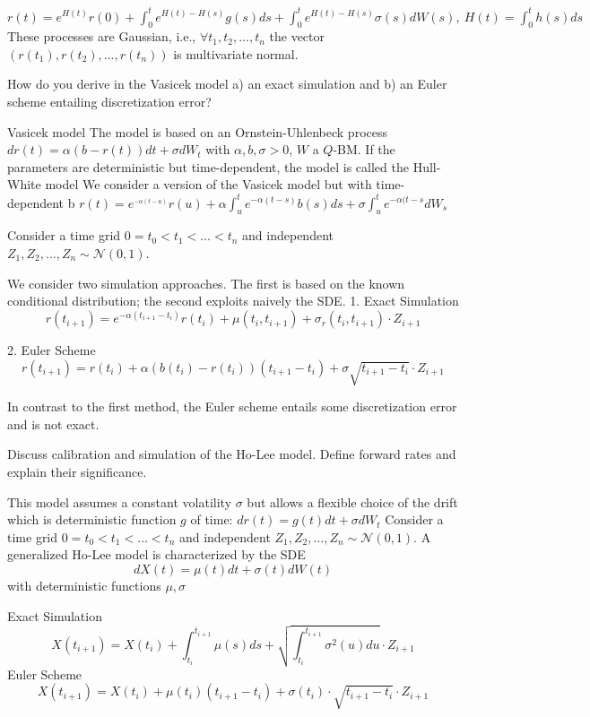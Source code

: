 \( r(t) = e^{H(t)} r(0) + \int_0^t e^{H(t)-H(s)} g(s) ds + \int_0^t e^{H(t)-H(s)} \sigma(s) dW(s), \ H(t) = \int_0^t h(s) ds \)
These processes are Gaussian, i.e., \(\forall t_1, t_2, ..., t_n\) the vector \((r(t_1), r(t_2), ..., r(t_n))\) is multivariate normal.

How do you derive in the Vasicek model a) an exact simulation and b) an Euler
scheme entailing discretization error?

Vasicek model
The model is based on an Ornstein-Uhlenbeck process
\( dr(t) = \alpha(b - r(t))dt + \sigma dW_t \)
with \( \alpha, b, \sigma > 0 \), \( W \) a \( Q \)-BM.
If the parameters are deterministic but time-dependent, the model is called the Hull-White model
We consider a version of the Vasicek model but with time-dependent b
\( r(t) = e^_{-\alpha(t-u)}r(u) + \alpha \int_{u}^{t} e^{-\alpha(t - s)} b(s) ds + \sigma \int_{u}^{t} e^{-\alpha(t-s}dW_s \)

Consider a time grid \(0=t_{0}<t_{1}<\dots<t_{n}\) and independent \(Z_{1},Z_{2},\dots,Z_{n}\sim\mathcal{N}(0,1)\).

We consider two simulation approaches. The first is based on the known conditional distribution; the second exploits naively the SDE.
1. Exact Simulation
\[r(t_{i+1})=e^{-\alpha(t_{i+1}-t_{i})}r(t_{i})+\mu(t_{i},t_{i+1})+\sigma_{r}(t_{i},t_{i+1})\cdot Z_{i+1}\]

2. Euler Scheme
\[r(t_{i+1})=r(t_{i})+\alpha(b(t_{i})-r(t_{i}))(t_{i+1}-t_{i})+\sigma\sqrt{t_{i+1}-t_{i}}\cdot Z_{i+1}\]

In contrast to the first method, the Euler scheme entails some discretization error and is not exact. 

Discuss calibration and simulation of the Ho-Lee model. Define forward rates and
explain their significance.

This model assumes a constant volatility \( \sigma \) but allows a flexible choice of the drift which is deterministic
function \( g \) of time:
\( dr(t) = g(t)dt + \sigma dW_t \)
Consider a time grid \(0=t_{0}<t_{1}<\dots<t_{n}\) and independent \(Z_{1},Z_{2},\dots,Z_{n}\sim\mathcal{N}(0,1)\).
 A generalized Ho-Lee model is characterized by the SDE
\[dX(t)=\mu(t)dt+\sigma(t)dW(t)\]
with deterministic functions \(\mu,\sigma\)

Exact Simulation
\[X(t_{i+1})=X(t_{i})+\int_{t_{i}}^{t_{i+1}}\mu(s)ds+\sqrt{\int_{t_{i}}^{t_{i+1}}\sigma^{2}(u)du}\cdot Z_{i+1}\]
Euler Scheme
\[X(t_{i+1})=X(t_{i})+\mu(t_{i})(t_{i+1}-t_{i})+\sigma(t_{i})\cdot\sqrt{t_{i+1}-t_{i}}\cdot Z_{i+1}\]


